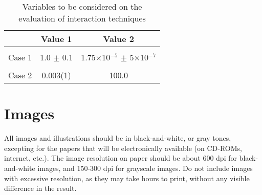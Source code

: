 \documentclass[12pt]{article}
\begin{document}
\begin{table}[ht]
\centering
\caption{Variables to be considered on the evaluation of interaction
  techniques}
\label{tab:exTable1}
\smallskip
\begin{tabular}{|l|c|c|}
\hline
& Value 1 & Value 2\\[0.5ex]
\hline
&&\\[-2ex]
Case 1 & 1.0 $\pm$ 0.1 & 1.75$\times$10$^{-5}$ $\pm$ 5$\times$10$^{-7}$\\[0.5ex]
\hline
&&\\[-2ex]
Case 2 & 0.003(1) & 100.0\\[0.5ex]
\hline
\end{tabular}
\end{table}

\section{Images}

All images and illustrations should be in black-and-white, or gray tones,
excepting for the papers that will be electronically available (on CD-ROMs,
internet, etc.). The image resolution on paper should be about 600 dpi for
black-and-white images, and 150-300 dpi for grayscale images.  Do not include
images with excessive resolution, as they may take hours to print, without any
visible difference in the result.



\end{document}
